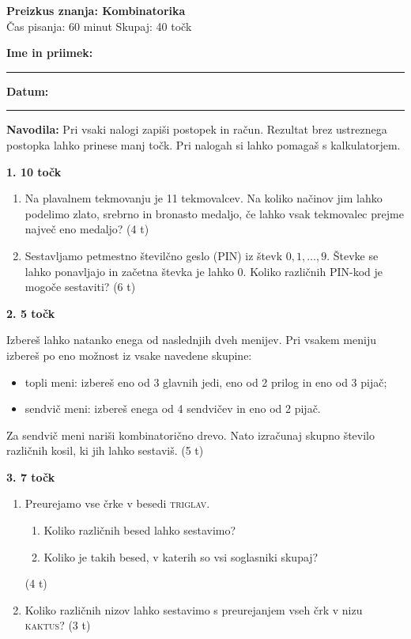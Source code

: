 \documentclass[11pt,a4paper]{article}
\newenvironment{taskbox}[1]{%
    \par\addvspace{8pt}%
    \noindent\textbf{\large #1}\par
}{\par\addvspace{4pt}}
\newcommand{\work}[1]{\par\vspace{#1}}
\begin{document}
\begin{center}
    {\LARGE\textbf{Preizkus znanja: Kombinatorika}}\\[4pt]
    {\large Čas pisanja: 60 minut \qquad Skupaj: 40 točk}
\end{center}

\textbf{Ime in priimek:} \rule{8cm}{0.4pt}
\hfill
\textbf{Datum:} \rule{3cm}{0.4pt}

\smallskip
\textbf{Navodila:} Pri vsaki nalogi zapiši postopek in račun.
Rezultat brez ustreznega postopka lahko prinese manj točk.
Pri nalogah si lahko pomagaš s kalkulatorjem.

\begin{taskbox}{1. \hfill 10 točk}
\begin{enumerate}[label=\alph*)]
    \item Na plavalnem tekmovanju je 11 tekmovalcev. Na koliko načinov jim lahko
    podelimo zlato, srebrno in bronasto medaljo, če lahko vsak tekmovalec prejme
    največ eno medaljo?
    \hfill (4 t)
    \work{7cm}
    \item Sestavljamo petmestno številčno geslo (PIN) iz števk
    \(0,1,\ldots,9\). Števke se lahko ponavljajo in začetna števka je lahko 0.
    Koliko različnih PIN-kod je mogoče sestaviti? \hfill (6 t)
    \work{7cm}
\end{enumerate}
\end{taskbox}

\clearpage
\begin{taskbox}{2. \hfill 5 točk}
Izbereš lahko natanko enega od naslednjih dveh menijev. Pri vsakem meniju
izbereš po eno možnost iz vsake navedene skupine:
\begin{itemize}
    \item topli meni: izbereš eno od 3 glavnih jedi, eno od 2 prilog in eno od 3 pijač;
    \item sendvič meni: izbereš enega od 4 sendvičev in eno od 2 pijač.
\end{itemize}
Za sendvič meni nariši kombinatorično drevo. Nato izračunaj skupno število
različnih kosil, ki jih lahko sestaviš. \hfill (5 t)
\work{7cm}
\end{taskbox}

\clearpage
\begin{taskbox}{3. \hfill 7 točk}
\begin{enumerate}[label=\alph*)]
    \item Preurejamo vse črke v besedi \textsc{triglav}.
    \begin{enumerate}[label=\roman*)]
        \item Koliko različnih besed lahko sestavimo?
        \item Koliko je takih besed, v katerih so vsi soglasniki skupaj?
    \end{enumerate}
    \hfill (4 t)
    \work{10cm}
    \item Koliko različnih nizov lahko sestavimo s preurejanjem vseh črk v nizu
    \textsc{kaktus}? \hfill (3 t)
    \work{7cm}
\end{enumerate}
\end{taskbox}
\end{document}
